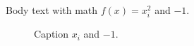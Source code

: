 \documentclass{IEEEtran}
\begin{document}
Body text with math $f(x) = x_{i}^{2}$ and $-1$.

\begin{figure}[htbp]
  \centering
  \caption{Caption $x_{i}$ and $-1$.}
\end{figure}
\end{document}
